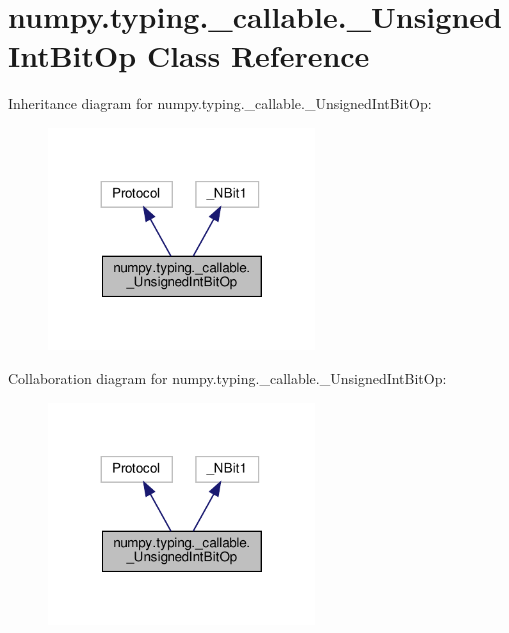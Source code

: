 \hypertarget{classnumpy_1_1typing_1_1__callable_1_1__UnsignedIntBitOp}{}\section{numpy.\+typing.\+\_\+callable.\+\_\+\+Unsigned\+Int\+Bit\+Op Class Reference}
\label{classnumpy_1_1typing_1_1__callable_1_1__UnsignedIntBitOp}


Inheritance diagram for numpy.\+typing.\+\_\+callable.\+\_\+\+Unsigned\+Int\+Bit\+Op\+:
\nopagebreak
\begin{figure}[H]
\begin{center}
\leavevmode
\includegraphics[width=200pt]{classnumpy_1_1typing_1_1__callable_1_1__UnsignedIntBitOp__inherit__graph}
\end{center}
\end{figure}


Collaboration diagram for numpy.\+typing.\+\_\+callable.\+\_\+\+Unsigned\+Int\+Bit\+Op\+:
\nopagebreak
\begin{figure}[H]
\begin{center}
\leavevmode
\includegraphics[width=200pt]{classnumpy_1_1typing_1_1__callable_1_1__UnsignedIntBitOp__coll__graph}
\end{center}
\end{figure}
